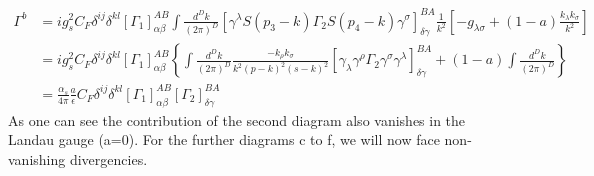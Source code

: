 	\begin{equation}
		\begin{split}
			\Gamma^{b} &= i g_s^2 C_F \delta^{ij}\delta^{kl} \left[\Gamma_1\right]^{AB}_{\alpha\beta} \int \frac{d^Dk}{(2\pi)^D} \left[\gamma^\lambda S(p_3-k) \Gamma_2 S(p_4-k) \gamma^\sigma \right]^{BA}_{\delta\gamma} \frac{1}{k^2}\left[-g_{\lambda\sigma } + (1-a) \frac{k_\lambda k_\sigma}{k^2}\right] \\
			&= i g_s^2 C_F \delta^{ij}\delta^{kl} \left[\Gamma_1\right]^{AB}_{\alpha\beta} \left\{ \int\frac{d^Dk}{(2\pi)^D} \frac{-k_\rho k_\sigma}{k^2(p-k)^2(s-k)^2} \left[\gamma_\lambda \gamma^\rho \Gamma_2 \gamma^\sigma \gamma^\lambda \right]^{BA}_{\delta\gamma} + (1-a) \int\frac{d^Dk}{(2\pi)^D}\right\} \\ 
			&= \frac{\alpha_s}{4\pi} \frac{a}{\epsilon} C_F \delta^{ij}\delta^{kl} \left[\Gamma_1\right]^{AB}_{\alpha\beta} \left[\Gamma_2\right]^{BA}_{\delta\gamma}
		\end{split}
	\end{equation}
	As one can see the contribution of the second diagram also vanishes in the Landau gauge (a=0). For the further diagrams c to f, we will now face non-vanishing divergencies.

